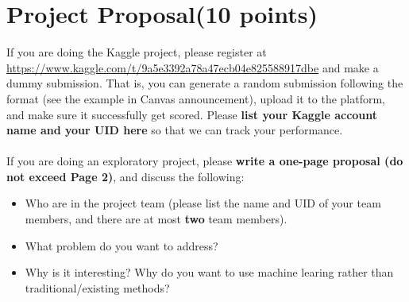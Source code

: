 \documentclass[12pt, fullpage,letterpaper]{article}
\begin{document}
\section*{Project Proposal(10 points)} 
If you are doing the Kaggle project, please register at \url{https://www.kaggle.com/t/9a5e3392a78a47ecb04e825588917dbe}  and make a dummy submission. That is, you can generate a random submission following the format (see the example in Canvas announcement), upload it to the platform, and make sure it successfully get scored. Please \textbf{list your Kaggle account name and your UID here} so that we can track your performance. 
\\
\\
\noindent If you are doing an exploratory project, please \textbf{write a one-page proposal (do not exceed Page 2)}, and discuss the following:
\begin{itemize}
	\item Who are in the project team (please list the name and UID of your team members, and there are at most \textbf{two} team members).
	\item What problem do you want to address?
	\item Why is it interesting? Why do you want to use machine learing rather than traditional/existing methods?
\end{itemize}
\end{document}
